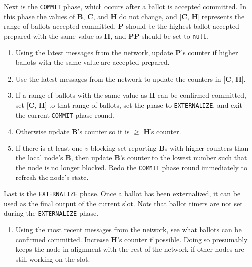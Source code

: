 Next is the {\tt COMMIT} phase, which occurs after a ballot is accepted committed. In this phase the values of \textbf{B}, \textbf{C}, and \textbf{H} do not change, and [\textbf{C}, \textbf{H}] represents the range of ballots accepted committed. \textbf{P} should be the highest ballot accepted prepared with the same value as \textbf{H}, and \textbf{PP} should be set to {\tt null}.

\begin{enumerate}
    \item Using the latest messages from the network, update \textbf{P}'s counter if higher ballots with the same value are accepted prepared.

    \item Use the latest messages from the network to update the counters in [\textbf{C}, \textbf{H}].

    \item If a range of ballots with the same value as \textbf{H} can be confirmed committed, set [\textbf{C}, \textbf{H}] to that range of ballots, set the phase to {\tt EXTERNALIZE}, and exit the current {\tt COMMIT} phase round.

    \item Otherwise update \textbf{B}'s counter so it is $\geq$ \textbf{H}'s counter.

    \item If there is at least one $v$-blocking set reporting \textbf{B}s with higher counters than the local node's \textbf{B}, then update \textbf{B}'s counter to the lowest number such that the node is no longer blocked. Redo the {\tt COMMIT} phase round immediately to refresh the node's state.
\end{enumerate}

Last is the {\tt EXTERNALIZE} phase. Once a ballot has been externalized, it can be used as the final output of the current slot. Note that ballot timers are not set during the {\tt EXTERNALIZE} phase.

\begin{enumerate}
    \item Using the most recent messages from the network, see what ballots can be confirmed committed. Increase \textbf{H}'s counter if possible. Doing so presumably keeps the node in alignment with the rest of the network if other nodes are still working on the slot.
\end{enumerate}



